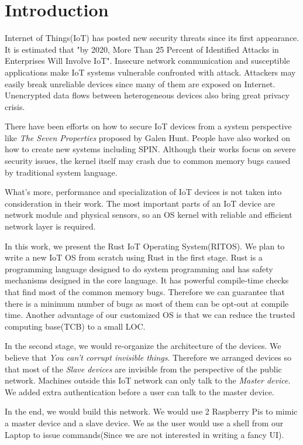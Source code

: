 \section{Introduction}

Internet of Things(IoT) has posted new security threats since its first appearance. It is estimated that "by 2020, More Than 25 Percent of Identified Attacks in Enterprises Will Involve IoT"\cite{gartner2016gartner}. Insecure network communication and susceptible applications make IoT systems vulnerable confronted with attack. Attackers may easily break unreliable devices since many of them are exposed on Internet\cite{kolias2017ddos}. Unencrypted data flows between heterogeneous devices also bring great privacy crisis\cite{khan2018iot}.


There have been efforts on how to secure IoT devices from a system perspective like \textit{The Seven Properties}\cite{hunt2017the} proposed by Galen Hunt. People have also worked on how to create new systems including SPIN\cite{hesselman2017spin}. Although their works focus on severe security issues, the kernel itself may crash due to common memory bugs caused by traditional system language.

What's more, performance and specialization of IoT devices is not taken into consideration in their work. The most important parts of an IoT device are network module and physical sensors, so an OS kernel with reliable and efficient network layer is required.



In this work, we present the Rust IoT Operating System(RITOS).
We plan to write a new IoT OS from scratch using Rust in the first stage.
Rust is a programming language designed to do system programming and has safety mechanisms designed in the core language.
It has powerful compile-time checks that find most of the common memory bugs.
Therefore we can guarantee that there is a minimum number of bugs as most of them can be opt-out at compile time. 
Another advantage of our customized OS is that we can reduce the trusted computing base(TCB) to a small LOC.

In the second stage, we would re-organize the architecture of the devices.
We believe that \textit{You can't corrupt invisible things}.
Therefore we arranged devices so that most of the \textit{Slave devices} are invisible from the perspective of the public network.
Machines outside this IoT network can only talk to the \textit{Master device}.
We added extra authentication before a user can talk to the master device.


In the end, we would build this network. 
We would use 2 Raspberry Pis to mimic a master device and a slave device. 
We as the user would use a shell from our Laptop to issue commands(Since we are not interested in writing a fancy UI).